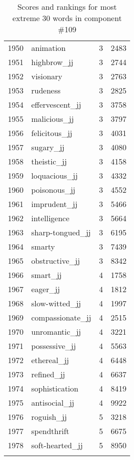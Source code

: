 \begin{longtable}[!htbp]{| rlr@{.}l |}
    1950 & animation & 3 & 2483 \\
    1951 & highbrow\_jj & 3 & 2744 \\
    1952 & visionary & 3 & 2763 \\
    1953 & rudeness & 3 & 2825 \\
    1954 & effervescent\_jj & 3 & 3758 \\
    1955 & malicious\_jj & 3 & 3797 \\
    1956 & felicitous\_jj & 3 & 4031 \\
    1957 & sugary\_jj & 3 & 4080 \\
    1958 & theistic\_jj & 3 & 4158 \\
    1959 & loquacious\_jj & 3 & 4332 \\
    1960 & poisonous\_jj & 3 & 4552 \\
    1961 & imprudent\_jj & 3 & 5466 \\
    1962 & intelligence & 3 & 5664 \\
    1963 & sharp-tongued\_jj & 3 & 6195 \\
    1964 & smarty & 3 & 7439 \\
    1965 & obstructive\_jj & 3 & 8342 \\
    1966 & smart\_jj & 4 & 1758 \\
    1967 & eager\_jj & 4 & 1812 \\
    1968 & slow-witted\_jj & 4 & 1997 \\
    1969 & compassionate\_jj & 4 & 2515 \\
    1970 & unromantic\_jj & 4 & 3221 \\
    1971 & possessive\_jj & 4 & 5563 \\
    1972 & ethereal\_jj & 4 & 6448 \\
    1973 & refined\_jj & 4 & 6637 \\
    1974 & sophistication & 4 & 8419 \\
    1975 & antisocial\_jj & 4 & 9922 \\
    1976 & roguish\_jj & 5 & 3218 \\
    1977 & spendthrift & 5 & 6675 \\
    1978 & soft-hearted\_jj & 5 & 8950 \\
    \hline
    \caption{Scores and rankings for most extreme 30 words in component \#109} \\
\end{longtable}

